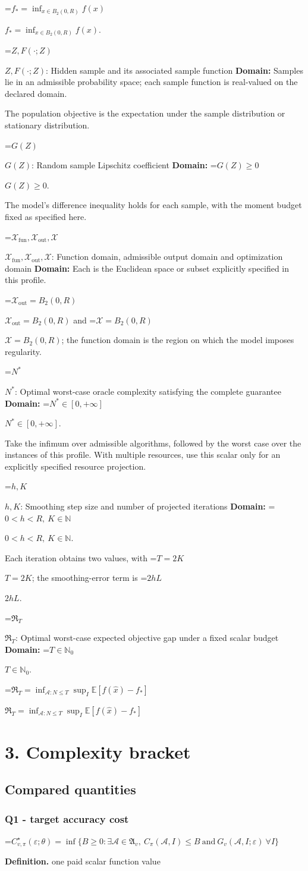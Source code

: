 \documentclass[10pt,a4paper]{article}
\newcommand{\AtlasMath}[1]{\par\begingroup\centering\setbox0=\hbox{$\displaystyle #1$}\ifdim\wd0>1.4\linewidth\typeout{ATLAS WIDE FORMULA: \the\wd0}\fi\ifdim\wd0>\linewidth\resizebox{\linewidth}{!}{\box0}\else\box0\fi\par\endgroup}
\newcommand{\AtlasInlineMath}[1]{\begingroup\setbox0=\hbox{$#1$}\ifdim\wd0>.4\linewidth\endgroup\AtlasMath{#1}\else\endgroup$#1$\fi}
\begin{document}
\AtlasInlineMath{f_*=\inf_{x\in B_2(0,R)}f(x)}.

\AtlasInlineMath{Z,F(\cdot;Z)}: Hidden sample and its associated sample function \textbf{Domain:} Samples lie in an admissible probability space; each sample function is real-valued on the declared domain.

The population objective is the expectation under the sample distribution or stationary distribution.

\AtlasInlineMath{G(Z)}: Random sample Lipschitz coefficient \textbf{Domain:} \AtlasInlineMath{G(Z)\ge0}.

The model's difference inequality holds for each sample, with the moment budget fixed as specified here.

\AtlasInlineMath{\mathcal{X}_{\mathrm{fun}},\mathcal{X}_{\mathrm{out}},\mathcal{X}}: Function domain, admissible output domain and optimization domain \textbf{Domain:} Each is the Euclidean space or subset explicitly specified in this profile.

\AtlasInlineMath{\mathcal{X}_{\mathrm{out}}=B_2(0,R)} and \AtlasInlineMath{\mathcal{X}=B_2(0,R)}; the function domain is the region on which the model imposes regularity.

\AtlasInlineMath{N^*}: Optimal worst-case oracle complexity satisfying the complete guarantee \textbf{Domain:} \AtlasInlineMath{N^*\in[0,+\infty]}.

Take the infimum over admissible algorithms, followed by the worst case over the instances of this profile. With multiple resources, use this scalar only for an explicitly specified resource projection.

\AtlasInlineMath{h,K}: Smoothing step size and number of projected iterations \textbf{Domain:} \AtlasInlineMath{0<h<R,\ K\in\mathbb{N}}.

Each iteration obtains two values, with \AtlasInlineMath{T=2K}; the smoothing-error term is \AtlasInlineMath{2hL}.

\AtlasInlineMath{\mathfrak R_T}: Optimal worst-case expected objective gap under a fixed scalar budget \textbf{Domain:} \AtlasInlineMath{T\in\mathbb{N}_0}.

\AtlasInlineMath{\mathfrak R_T=\inf_{\mathcal{A}:N\le T}\sup_I\mathbb{E}[f(\widehat{x})-f_*]}

\section{3. Complexity bracket}
\subsection{Compared quantities}
\subsubsection{Q1 - target accuracy cost}
\AtlasMath{C^\star_{v,\pi}(\varepsilon;\theta)=\inf\{B\ge0:\exists\mathcal A\in\mathfrak A_v,\ C_\pi(\mathcal A,I)\le B\ \text{and}\ G_v(\mathcal A,I;\varepsilon)\ \forall I\}}
\textbf{Definition.} one paid scalar function value
\end{document}

